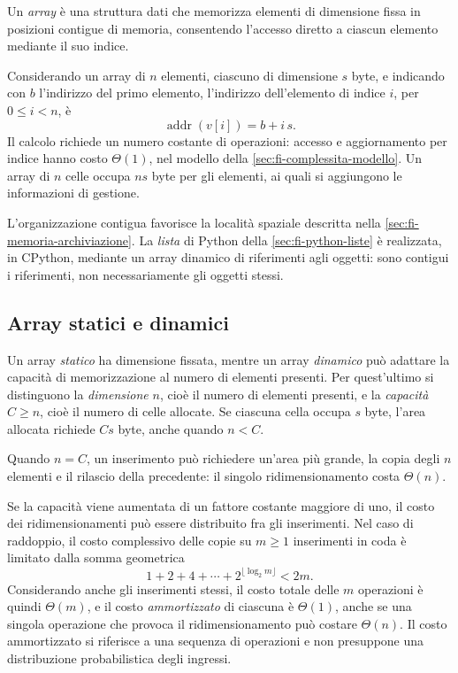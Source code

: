 \begin{definition}[Array]
\label{def:fi-array}
Un \emph{array} è una struttura dati che memorizza elementi di
dimensione fissa in posizioni contigue di memoria, consentendo
l'accesso diretto a ciascun elemento mediante il suo indice.
\end{definition}

Considerando un array di \(n\) elementi, ciascuno di dimensione
\(s\) byte, e indicando con \(b\) l'indirizzo del primo elemento,
l'indirizzo dell'elemento di indice \(i\), per \(0\le i<n\), è
\[
  \operatorname{addr}(v[i])=b+i\,s.
\]
Il calcolo richiede un numero costante di operazioni: accesso e
aggiornamento per indice hanno costo \(\Theta(1)\), nel modello
della \cref{sec:fi-complessita-modello}. Un array di \(n\) celle
occupa \(ns\) byte per gli elementi, ai quali si aggiungono le
informazioni di gestione.

L'organizzazione contigua favorisce la località spaziale descritta
nella \cref{sec:fi-memoria-archiviazione}. La \emph{lista} di Python
della \cref{sec:fi-python-liste} è realizzata, in CPython, mediante
un array dinamico di riferimenti agli oggetti: sono contigui i
riferimenti, non necessariamente gli oggetti stessi.

\subsection{Array statici e dinamici}
\label{sec:fi-array-dinamici}

Un array \emph{statico} ha dimensione fissata, mentre un array
\emph{dinamico} può adattare la capacità di memorizzazione al numero
di elementi presenti. Per quest'ultimo si distinguono la
\emph{dimensione} \(n\), cioè il numero di elementi presenti,
e la \emph{capacità} \(C\ge n\), cioè il numero di celle allocate.
Se ciascuna cella occupa \(s\) byte, l'area allocata richiede
\(Cs\) byte, anche quando \(n<C\).

Quando \(n=C\), un inserimento può richiedere un'area più grande,
la copia degli \(n\) elementi e il rilascio della precedente:
il singolo ridimensionamento costa \(\Theta(n)\).

Se la capacità viene aumentata di un fattore costante maggiore di
uno, il costo dei ridimensionamenti può essere distribuito fra
gli inserimenti. Nel caso di raddoppio, il costo complessivo delle
copie su \(m\ge1\) inserimenti in coda è limitato dalla somma
geometrica
\[
  1+2+4+\cdots+2^{\lfloor\log_2 m\rfloor}<2m.
\]
Considerando anche gli inserimenti stessi, il costo totale delle
\(m\) operazioni è quindi \(\Theta(m)\), e il costo
\emph{ammortizzato} di ciascuna è \(\Theta(1)\), anche se una
singola operazione che provoca il ridimensionamento può costare
\(\Theta(n)\). Il costo ammortizzato si riferisce a una sequenza
di operazioni e non presuppone una distribuzione probabilistica
degli ingressi.

